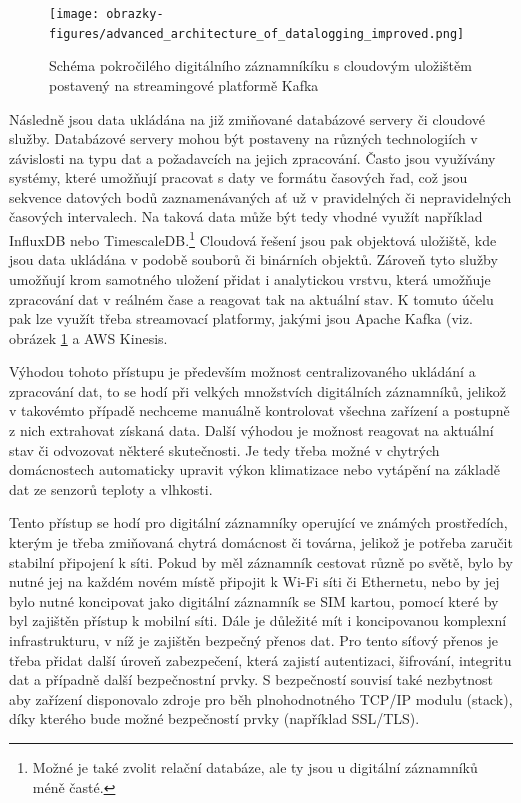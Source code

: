 \begin{figure}[h]
    \centering
    \texttt{[image: obrazky-figures/advanced\_architecture\_of\_datalogging\_improved.png]}
    
    \caption{Schéma pokročilého digitálního záznamníkíku s cloudovým uložištěm postavený na streamingové platformě Kafka \cite{confluent_advanced_datalogging, influxdata_advanced_datalogging_mmqt}}
    \label{fig:advanced-architecture-of-datalogging}
\end{figure}


Následně jsou data ukládána na již zmiňované databázové servery či cloudové služby. Databázové servery mohou být postaveny na různých technologiích v závislosti na typu dat a požadavcích na jejich zpracování. Často jsou využívány systémy, které umožňují pracovat s daty ve formátu časových řad, což jsou sekvence datových bodů zaznamenávaných ať už v pravidelných či nepravidelných časových intervalech. Na taková data může být tedy vhodné využít například InfluxDB nebo TimescaleDB.\footnote{Možné je také zvolit relační databáze, ale ty jsou u digitální záznamníků méně časté.} Cloudová řešení jsou pak objektová uložiště, kde jsou data ukládána v podobě souborů či binárních objektů. Zároveň tyto služby umožňují krom samotného uložení přidat i analytickou vrstvu, která umožňuje zpracování dat v reálném čase a reagovat tak na aktuální stav. K tomuto účelu pak lze využít třeba streamovací platformy, jakými jsou Apache Kafka (viz. obrázek \ref{fig:advanced-architecture-of-datalogging} a AWS Kinesis. \cite{springer_analysis_time_series_db_edge_computing}

Výhodou tohoto přístupu je především možnost centralizovaného ukládání a zpracování dat, to se hodí při velkých množstvích digitálních záznamníků, jelikož v takovémto případě nechceme manuálně kontrolovat všechna zařízení a postupně z nich extrahovat získaná data. Další výhodou je možnost reagovat na aktuální stav či odvozovat některé skutečnosti. Je tedy třeba možné v chytrých domácnostech automaticky upravit výkon klimatizace nebo vytápění na základě dat ze senzorů teploty a vlhkosti. \cite{springer_analysis_time_series_db_edge_computing}

Tento přístup se hodí pro digitální záznamníky operující ve známých prostředích, kterým je třeba zmiňovaná chytrá domácnost či továrna, jelikož je potřeba zaručit stabilní připojení k síti. Pokud by měl záznamník cestovat různě po světě, bylo by nutné jej na každém novém místě připojit k Wi-Fi síti či Ethernetu, nebo by jej bylo nutné koncipovat jako digitální záznamník se SIM kartou, pomocí které by byl zajištěn přístup k mobilní síti. Dále je důležité mít i koncipovanou komplexní infrastrukturu, v níž je zajištěn bezpečný přenos dat. Pro tento síťový přenos je třeba přidat další úroveň zabezpečení, která zajistí autentizaci, šifrování, integritu dat a případně další bezpečnostní prvky. S bezpečností souvisí také nezbytnost aby zařízení disponovalo zdroje pro běh plnohodnotného TCP/IP modulu
(stack), díky kterého bude možné bezpečností prvky (například SSL/TLS).


